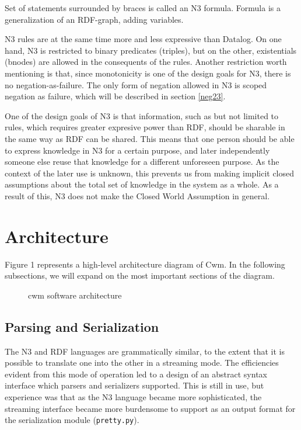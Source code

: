 \documentclass{tlp}
\begin{document}
\par Set of statements surrounded by braces is called an N3 formula.
Formula is a generalization of an RDF-graph, adding variables.

\par N3 rules are at the same time more and less expressive than
Datalog. On one hand, N3 is restricted to binary predicates
(triples), but on the other, existentials (bnodes) are allowed in
the consequents of the rules. Another restriction worth mentioning
is that, since monotonicity is one of the design goals for N3,
there is no negation-as-failure. The only form of negation allowed
in N3 is scoped negation as failure, which will be described in
section \ref{neg23}.

\par One of the design goals of N3 is that information, such as but
not limited to rules, which requires greater expresive power than
RDF, should be sharable in the same way as RDF can be shared. This
means that one person should be able to express knowledge in N3 for
a certain purpose, and later independently someone else reuse that
knowledge for a different unforeseen purpose. As the context of the
later use is unknown, this prevents us from making implicit closed
assumptions about the total set of knowledge in the system as a
whole. As a result of this, N3 does not make the Closed World
Assumption in general.
\section{Architecture}
  

\par Figure 1 represents a high-level architecture diagram of Cwm. In
the following subsections, we will expand on the most important
sections of the diagram.
\begin{figure}[tb]
\centerline{}

\caption{cwm software architecture}\label{cwmarch}

\end{figure}

\subsection{Parsing and Serialization}
  

\par The N3 and RDF languages are grammatically similar, to the
extent that it is possible to translate one into the other in a
streaming mode. The efficiencies evident from this mode of
operation led to a design of an abstract syntax interface which
parsers and serializers supported. This is still in use, but
experience was that as the N3 language became more sophisticated,
the streaming interface became more burdensome to support as an
output format for the serialization module
({\tt pretty.py}).
\end{document}
